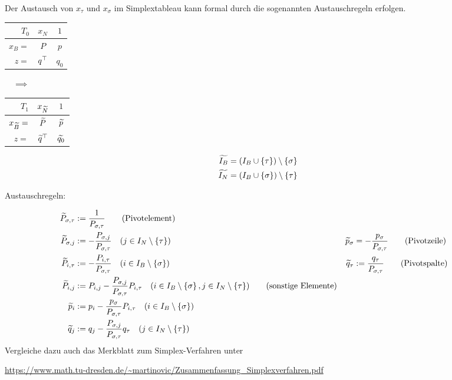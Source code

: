 Der Austausch von $x_\tau$ und $x_\sigma$ im Simplextableau kann formal durch die sogenannten Austauschregeln erfolgen.

\begin{center}
	\begin{tabular}{r|c|c}
		$T_0$ & $x_N$ & $1$ \\ \hline
		$x_B = $ & $P$ & $p$ \\ \hline
		$z =$ & $q^{\top}$ & $q_0$
	\end{tabular}
	$\quad \implies \quad$
	\begin{tabular}{r|c|c}
		$T_1$ & $x_{\widetilde{N}}$ & $1$ \\ \hline
		$x_{\widetilde{B}} = $ & $\widetilde{P}$ & $\widetilde{p}$ \\ \hline
		$z =$ & $\widetilde{q}^{\top}$ & $\widetilde{q_0}$
	\end{tabular}
	\begin{align*}
		\widetilde{I_B} &= \left( I_B \cup \left\{ \tau \right\} \right) \setminus \left\{ \sigma \right\} \\
		\widetilde{I_N} &= \left( I_B \cup \left\{ \sigma \right\} \right) \setminus \left\{ \tau \right\}
	\end{align*}
\end{center}

Austauschregeln:

\begin{align*}
	\widetilde{P}_{\sigma , \tau} &\mathrel{:=} \frac{1}{P_{\sigma,  \tau}} 
	\tag{Pivotelement} \\
	\widetilde{P}_{\sigma, j} &\mathrel{:=} - \frac{P_{\sigma, j}}{P_{\sigma, \tau}} \quad (j \in I_N \setminus \left\{ \tau \right\}) & \widetilde{p}_\sigma &= - \frac{p_\sigma}{P_{\sigma, \tau}} 
	\tag{Pivotzeile} \\
	\widetilde{P}_{i, \tau} &\mathrel{:=} - \frac{P_{i, \tau}}{P_{\sigma, \tau}} \quad (i \in I_B \setminus \left\{ \sigma \right\}) & \widetilde{q}_\tau &\mathrel{:=} \frac{q_\tau}{P_{\sigma, \tau}}
	\tag{Pivotspalte} \\
	\widetilde{P}_{i,j} &\mathrel{:=} P_{i,j} - \frac{P_{\sigma, j}}{P_{\sigma, \tau}} P_{i,\tau} \quad (i \in I_B \setminus \left\{ \sigma \right\} , j \in I_N \setminus \left\{ \tau \right\}) 
	\tag{sonstige Elemente}\\
	\widetilde{p}_i &\mathrel{:=} p_i - \frac{p_\sigma}{P_{\sigma, \tau}} P_{i,\tau} \quad (i \in I_B \setminus \left\{ \sigma \right\}) \\
	\widetilde{q}_j &\mathrel{:=} q_j - \frac{P_{\sigma, j}}{P_{\sigma, \tau}} q_\tau \quad (j \in I_N \setminus \left\{ \tau \right\}) \\
\end{align*}
Vergleiche dazu auch das Merkblatt zum Simplex-Verfahren unter \vspace{-\parskip}
\begin{center}
	\url{https://www.math.tu-dresden.de/~martinovic/Zusammenfassung_Simplexverfahren.pdf}
\end{center}

